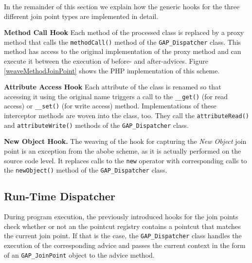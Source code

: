 \documentclass{acm_proc_article-sp}
\begin{document}
In the remainder of this section we explain how the generic hooks
for the three different join point types are implemented in
detail.

\textbf{Method Call Hook} Each method of the processed class is
replaced by a proxy method that calls the \texttt{methodCall()}
method of the \texttt{GAP\_Dispatcher} class. This method has
access to the original implementation of the proxy method
and can execute it between the execution of before- and
after-advices. Figure \ref{weaveMethodJoinPoint} shows
the PHP implementation of this scheme.

\textbf{Attribute Access Hook} Each attribute of the class is
renamed so that accessing it using the original name triggers a
call to the \texttt{\_\_get()} (for read access) or
\texttt{\_\_set()} (for write access) method. Implementations of
these interceptor methods  are woven into the class, too. They
call the \texttt{attributeRead()} and \texttt{attributeWrite()}
methods of the \texttt{GAP\_Dispatcher} class.

\textbf{New Object Hook.} The weaving of the hook for capturing
the \emph{New Object} join point is an exception from the abobe
scheme, as it is actually performed on the source code level. It
replaces calls to the \texttt{new} operator with corresponding
calls to the \texttt{newObject()} method of the
\texttt{GAP\_Dispatcher} class.

\subsection{Run-Time Dispatcher}
During program execution, the previously introduced hooks for the
join points check whether or not an the pointcut registry contains
a pointcut that matches the current join point. If that is the
case, the \texttt{GAP\_Dispatcher} class handles the execution of
the corresponding advice and passes the current context in the
form of an \texttt{GAP\_JoinPoint} object to the advice method.

%
\end{document}
